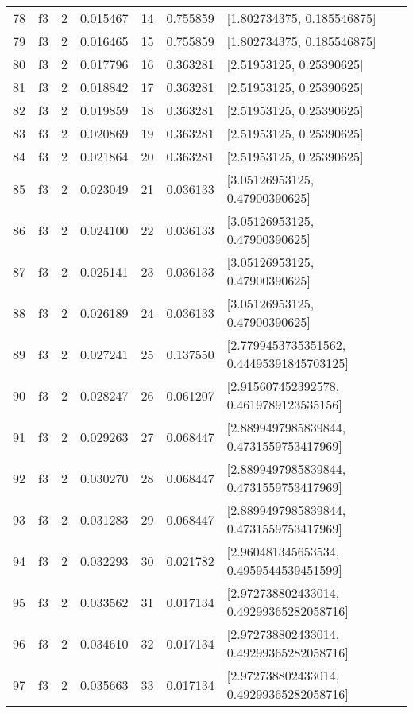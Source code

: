 \begin{tabular}{lllrlrl}
78  &  f3 &   2 &  0.015467 &   14 &  0.755859 &                 [1.802734375, 0.185546875] \\
79  &  f3 &   2 &  0.016465 &   15 &  0.755859 &                 [1.802734375, 0.185546875] \\
80  &  f3 &   2 &  0.017796 &   16 &  0.363281 &                   [2.51953125, 0.25390625] \\
81  &  f3 &   2 &  0.018842 &   17 &  0.363281 &                   [2.51953125, 0.25390625] \\
82  &  f3 &   2 &  0.019859 &   18 &  0.363281 &                   [2.51953125, 0.25390625] \\
83  &  f3 &   2 &  0.020869 &   19 &  0.363281 &                   [2.51953125, 0.25390625] \\
84  &  f3 &   2 &  0.021864 &   20 &  0.363281 &                   [2.51953125, 0.25390625] \\
85  &  f3 &   2 &  0.023049 &   21 &  0.036133 &             [3.05126953125, 0.47900390625] \\
86  &  f3 &   2 &  0.024100 &   22 &  0.036133 &             [3.05126953125, 0.47900390625] \\
87  &  f3 &   2 &  0.025141 &   23 &  0.036133 &             [3.05126953125, 0.47900390625] \\
88  &  f3 &   2 &  0.026189 &   24 &  0.036133 &             [3.05126953125, 0.47900390625] \\
89  &  f3 &   2 &  0.027241 &   25 &  0.137550 &  [2.7799453735351562, 0.44495391845703125] \\
90  &  f3 &   2 &  0.028247 &   26 &  0.061207 &    [2.915607452392578, 0.4619789123535156] \\
91  &  f3 &   2 &  0.029263 &   27 &  0.068447 &   [2.8899497985839844, 0.4731559753417969] \\
92  &  f3 &   2 &  0.030270 &   28 &  0.068447 &   [2.8899497985839844, 0.4731559753417969] \\
93  &  f3 &   2 &  0.031283 &   29 &  0.068447 &   [2.8899497985839844, 0.4731559753417969] \\
94  &  f3 &   2 &  0.032293 &   30 &  0.021782 &    [2.960481345653534, 0.4959544539451599] \\
95  &  f3 &   2 &  0.033562 &   31 &  0.017134 &   [2.972738802433014, 0.49299365282058716] \\
96  &  f3 &   2 &  0.034610 &   32 &  0.017134 &   [2.972738802433014, 0.49299365282058716] \\
97  &  f3 &   2 &  0.035663 &   33 &  0.017134 &   [2.972738802433014, 0.49299365282058716] \\

\end{tabular}

